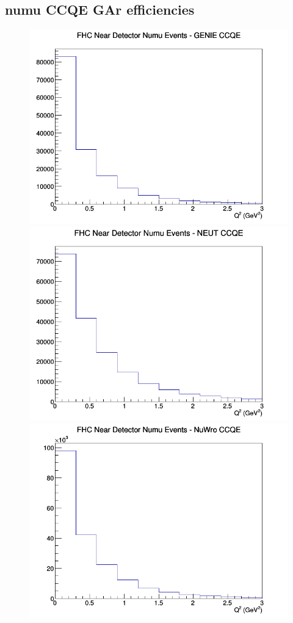 \documentclass[12pt]{article}
\begin{document}
\subsection{numu CCQE GAr efficiencies}
\begin{figure}[h]
\includegraphics[width=\linewidth]{eff_Q2/GAr/CCQE_FHC_ND_numu_Q2_GENIE.png}
\endminipage
{}
\includegraphics[width=\linewidth]{eff_Q2/GAr/CCQE_FHC_ND_numu_Q2_NEUT.png}
\endminipage
{}
\includegraphics[width=\linewidth]{eff_Q2/GAr/CCQE_FHC_ND_numu_Q2_NuWro.png}

\end{figure}
\end{document}
